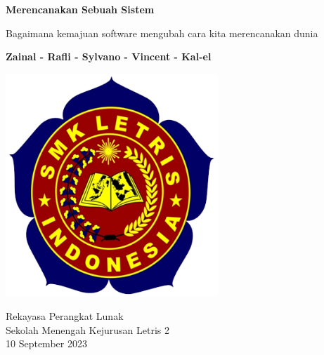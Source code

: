 \begin{titlepage}
    \begin{center}
        \vspace*{1cm}
        
        \Huge
        \textbf{Merencanakan Sebuah Sistem}
        
        \vspace{0.5cm}
        \LARGE
        Bagaimana kemajuan software mengubah cara kita merencanakan dunia

        \vspace{1.5cm}
        
        \textbf{Zainal - Rafli - Sylvano - Vincent - Kal-el}
        
        
        
        \vspace{1cm}
        
        \includegraphics[width=0.6\textwidth]{images/letrisLogo.jpg}
        
        \vfill

        \Large
        Rekayasa Perangkat Lunak\\
        Sekolah Menengah Kejurusan Letris 2\\
        10 September 2023
        
    \end{center}
\end{titlepage}
